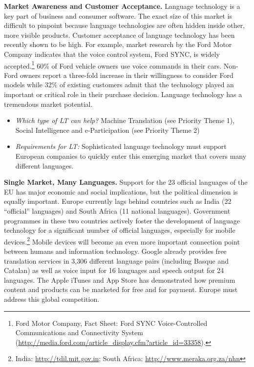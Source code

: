 \documentclass[10pt, plain]{../../metanetpaper}
\begin{document}
\begin{multicols}{2}
\textbf{Market Awareness and Customer Acceptance.} Language technology is a key part of business and consumer software. The exact size of this market is difficult to pinpoint because language technologies are often hidden inside other, more visible products. Customer acceptance of language technology has been recently shown to be high. For example, market research by the Ford Motor Company indicates that the voice control system, Ford SYNC, is widely accepted.\footnote{Ford Motor Company, Fact Sheet: Ford SYNC Voice-Controlled Communications and Connectivity System (\url{http://media.ford.com/article_display.cfm?article_id=33358}).} 60\% of Ford vehicle owners use voice commands in their cars. Non-Ford owners report a three-fold increase in their willingness to consider Ford models while 32\% of existing customers admit that the technology played an important or critical role in their purchase decision. Language technology has a tremendous market potential.

\begin{itemize}
\item \emph{Which type of LT can help?} Machine Translation (see Priority Theme 1), Social Intelligence and e-Participation (see Priority Theme 2)
\item \emph{Requirements for LT:} Sophisticated language technology must support European companies to quickly enter this emerging market that covers many different languages.
\end{itemize}

\textbf{Single Market, Many Languages.} Support for the 23 official languages of the EU has major economic and social implications, but the political dimension is equally important. Europe currently lags behind countries such as India (22 “official” languages) and South Africa (11 national languages). Government programmes in these two countries actively foster the development of language technology for a significant number of official languages, especially for mobile devices.\footnote{India: \url{http://tdil.mit.gov.in}; South Africa: \url{http://www.meraka.org.za/nhn}} Mobile devices will become an even more important connection point between humans and information technology. Google already provides free translation services in 3,306 different language pairs (including Basque and Catalan) as well as voice input for 16 languages and speech output for 24 languages. The Apple iTunes and App Store has demonstrated how premium content and products can be marketed for free and for payment. Europe must address this global competition. 


\end{multicols}
\end{document}

